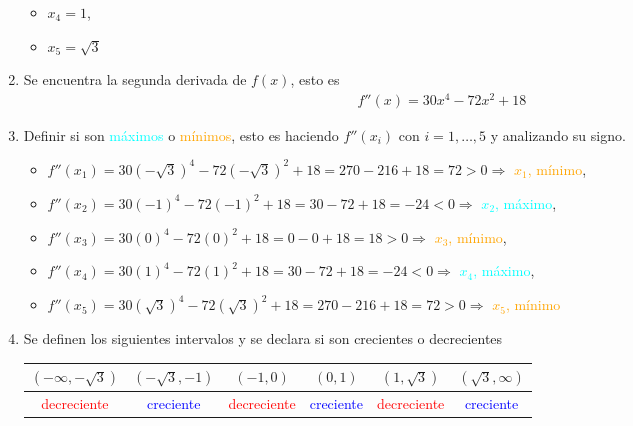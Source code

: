 \documentclass[legalpaper, 12pt]{exam}
\begin{document}
\begin{questions}
\begin{solution}
\begin{enumerate}
\begin{multicols}{3}
\begin{itemize}
                \item $x_4 = 1$,
                \item $x_5 = \sqrt{3}$
            \end{itemize}
        \end{multicols}
    \item Se encuentra la segunda derivada de $f(x)$, esto es
        \begin{align*}
        f''(x) = 30x^4 - 72x^2 + 18
        \end{align*}
    \item Definir si son \textcolor{cyan}{máximos} o \textcolor{orange}{mínimos}, esto es haciendo $f''(x_i)$ con $i = 1,\ldots,5$ y analizando su signo.
        \begin{itemize}
            \item $f''(x_1) = 30\left(-\sqrt{3}\right)^4 - 72\left(-\sqrt{3}\right)^2 + 18 = 270 - 216 + 18 = 72 > 0\Rightarrow$ \textcolor{orange}{$x_1$, mínimo},
            \item $f''(x_2) = 30\left(-1\right)^4 - 72\left(-1\right)^2 + 18 = 30 -72 + 18 = -24 < 0\Rightarrow$ \textcolor{cyan}{$x_2$, máximo},
            \item $f''(x_3) = 30\left(0\right)^4 - 72\left(0\right)^2 + 18 = 0 - 0 + 18 = 18 > 0\Rightarrow$ \textcolor{orange}{$x_3$, mínimo},
            \item $f''(x_4) = 30\left(1\right)^4 - 72\left(1\right)^2 + 18 = 30 -72 + 18 = -24 < 0\Rightarrow$ \textcolor{cyan}{$x_4$, máximo},
            \item $f''(x_5) = 30\left(\sqrt{3}\right)^4 - 72\left(\sqrt{3}\right)^2 + 18 = 270 - 216 + 18 = 72 > 0\Rightarrow$ \textcolor{orange}{$x_5$, mínimo}
        \end{itemize}
    \item Se definen los siguientes intervalos y se declara si son crecientes o decrecientes
        \begin{center}
        \begin{tabular}{|c|c|c|c|c|c|}
        \hline
        $\left(-\infty,-\sqrt{3}\right)$ & $\left(-\sqrt{3},-1\right)$ & $\left(-1,0\right)$ & $\left(0,1\right)$ & $\left(1,\sqrt{3}\right)$ & $\left(\sqrt{3},\infty\right)$ \\
        \hline
        \textcolor{red}{decreciente} & \textcolor{blue}{creciente} & \textcolor{red}{decreciente} & \textcolor{blue}{creciente} & \textcolor{red}{decreciente} & \textcolor{blue}{creciente}\\
        \hline
        \end{tabular}

\end{center}
\end{enumerate}
\end{solution}
\end{questions}
\end{document}
